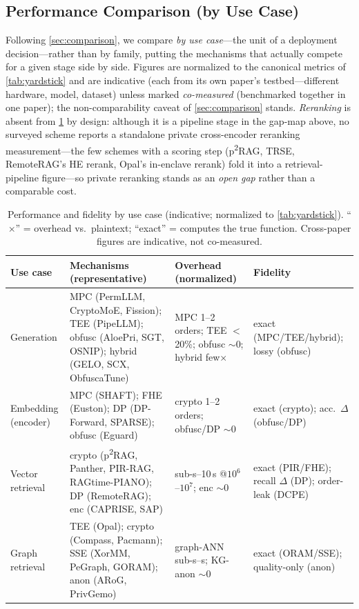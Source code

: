 \subsection{Performance Comparison (by Use Case)}
Following \cref{sec:comparison}, we compare \emph{by use case}---the unit of a deployment
decision---rather than by family, putting the mechanisms that actually compete for a given
stage side by side. Figures are normalized to the canonical metrics of
\cref{tab:yardstick} and are indicative (each from its own paper's testbed---different
hardware, model, dataset) unless marked \emph{co-measured} (benchmarked together in one
paper); the non-comparability caveat of \cref{sec:comparison} stands.
\emph{Reranking} is absent from \cref{tab:performance} by design: although it is a pipeline
stage in the gap-map above, no surveyed scheme reports a standalone private cross-encoder
reranking measurement---the few schemes with a scoring step (p\textsuperscript{2}RAG, TRSE,
RemoteRAG's HE rerank, Opal's in-enclave rerank) fold it into a retrieval-pipeline figure---so
private reranking stands as an \emph{open gap} rather than a comparable cost.
\begin{table}[t]
  \centering \footnotesize
  \caption{Performance and fidelity by use case (indicative; normalized to
    \cref{tab:yardstick}). ``$\times$'' = overhead vs.\ plaintext; ``exact'' = computes the
    true function. Cross-paper figures are indicative, not co-measured.}
  \label{tab:performance}
  \begin{tabular}{@{}>{\raggedright\arraybackslash}p{1.6cm}>{\raggedright\arraybackslash}p{6.3cm}>{\raggedright\arraybackslash}p{3.6cm}>{\raggedright\arraybackslash}p{3.6cm}@{}}
    \toprule
    Use case & Mechanisms (representative) & Overhead (normalized) & Fidelity \\
    \midrule
    Generation & MPC (PermLLM, CryptoMoE, Fission); TEE (PipeLLM); obfusc (AloePri, SGT, OSNIP); hybrid (GELO, SCX, ObfuscaTune)
               & MPC 1--2 orders; TEE $<$20\%; obfusc $\sim$0; hybrid few$\times$
               & exact (MPC/TEE/hybrid); lossy (obfusc) \\
    Embedding (encoder) & MPC (SHAFT); FHE (Euston); DP (DP-Forward, SPARSE); obfusc (Eguard)
               & crypto 1--2 orders; obfusc/DP $\sim$0
               & exact (crypto); acc.\ $\Delta$ (obfusc/DP) \\
    Vector retrieval & crypto (p\textsuperscript{2}RAG, Panther, PIR-RAG, RAGtime-PIANO); DP (RemoteRAG); enc (CAPRISE, SAP)
               & sub-s--10\,s @$10^6$--$10^7$; enc $\sim$0
               & exact (PIR/FHE); recall $\Delta$ (DP); order-leak (DCPE) \\
    Graph retrieval & TEE (Opal); crypto (Compass, Pacmann); SSE (XorMM, PeGraph, GORAM); anon (ARoG, PrivGemo)
               & graph-ANN sub-s--s; KG-anon $\sim$0
               & exact (ORAM/SSE); quality-only (anon) \\
    \bottomrule
  \end{tabular}
\end{table}
